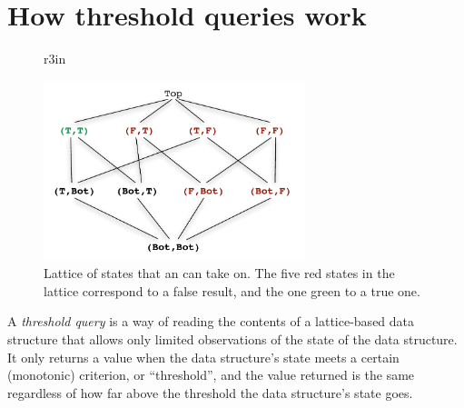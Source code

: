 \section{How threshold queries work}\label{s:threshold-reads}

\begin{figure}{r}{3in}
\vspace{-4em}
\begin{center}
  \includegraphics[width=3in]{chapter5/figures/parallel-and-take-2.pdf}
\end{center}
  \caption{Lattice of states that an  can take on.  The five red
    states in the lattice correspond to a false result, and the one green to a true one.}
  \label{f:parallel-and}
\vspace{-2em}
\end{figure}

A \emph{threshold query} is a way of reading the contents of a
lattice-based data structure that allows only limited observations of
the state of the data structure.  It only returns a value when the
data structure's state meets a certain (monotonic) criterion, or
``threshold'', and the value returned is the same regardless of how
far above the threshold the data structure's state goes.  

